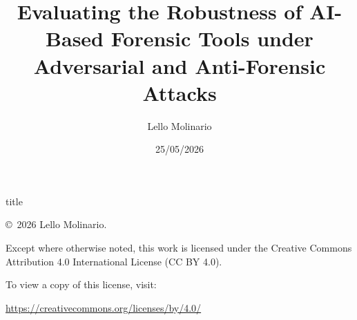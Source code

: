 \documentclass{report}
\title{Evaluating the Robustness of AI-Based Forensic Tools under Adversarial and Anti-Forensic Attacks}
\author{Lello Molinario}
\date{25/05/2026}
\begin{document}

\pagestyle{frontmatterstyle}


\DisableBoldFirstAcronyms

\hypersetup{pageanchor=false}
{title}
\hypersetup{pageanchor=true}

\clearpage
\thispagestyle{empty}

\null
\vfill

\begin{center}
\small
\copyright\ 2026 Lello Molinario.

\vspace{1em}

Except where otherwise noted, this work is licensed under the
Creative Commons Attribution 4.0 International License (CC BY 4.0).

\vspace{1em}

To view a copy of this license, visit:

\href{https://creativecommons.org/licenses/by/4.0/}
{https://creativecommons.org/licenses/by/4.0/}
\end{center}

\vspace*{1.5cm}

\clearpage







\clearpage
\pagestyle{empty}

\clearpage
\pagestyle{plain}

\tableofcontents
\clearpage

\listoffigures
\clearpage

\listoftables
\clearpage
\end{document}
